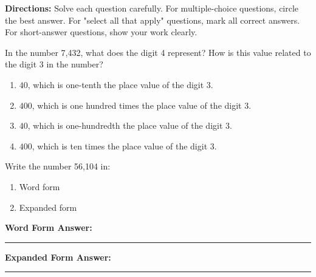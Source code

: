 \documentclass[12pt]{article}
\begin{document}

\begin{tcolorbox}[colframe=black!50, colback=white, title=Assessment Directions]
\textbf{Directions:} Solve each question carefully. For multiple-choice questions, circle the best answer. For "select all that apply" questions, mark all correct answers. For short-answer questions, show your work clearly.
\end{tcolorbox}

\begin{tcolorbox}[colframe=black!50, colback=white, title=\textbf{Problem 1}]
In the number 7,432, what does the digit 4 represent? How is this value related to the digit 3 in the number?

\begin{enumerate}[label=(\Alph*)]
    \item \(40\), which is one-tenth the place value of the digit 3.
    \item \(400\), which is one hundred times the place value of the digit 3.
    \item \(40\), which is one-hundredth the place value of the digit 3.
    \item \(400\), which is ten times the place value of the digit 3.
\end{enumerate}
\end{tcolorbox}


\begin{tcolorbox}[colframe=black!50, colback=white, title=\textbf{Problem 2}]
Write the number 56,104 in:
\begin{enumerate}
    \item Word form
    \item Expanded form
\end{enumerate}

\vspace{1cm}
\textbf{Word Form Answer:}  
\vspace{.5cm}
\rule{0.7\textwidth}{0.4mm}
\vspace{.2cm}

\textbf{Expanded Form Answer:}  
\vspace{.2cm}
\rule{0.63\textwidth}{0.4mm}
\end{tcolorbox}
\end{document}
